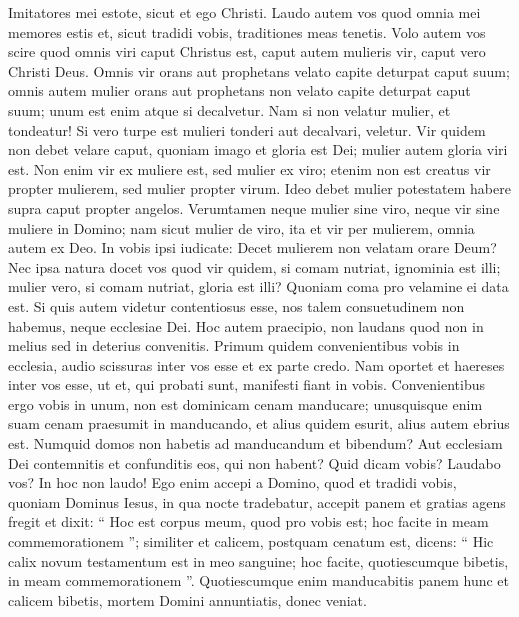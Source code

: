 \begin{biblechapter}
\begin{biblechapter}
\begin{biblechapter}
\begin{biblechapter}
\begin{biblechapter}
\begin{biblechapter}
\begin{biblechapter}
\begin{biblechapter}
\begin{biblechapter}
\begin{biblechapter}
\begin{biblechapter}
\verse Imitatores mei estote, sicut et ego Christi.
 \verse Laudo autem vos quod omnia mei memores estis et, sicut tradidi vobis, traditiones meas tenetis. 
\verse Volo autem vos scire quod omnis viri caput Christus est, caput autem mulieris vir, caput vero Christi Deus. 
\verse Omnis vir orans aut prophetans velato capite deturpat caput suum; 
\verse omnis autem mulier orans aut prophetans non velato capite deturpat caput suum; unum est enim atque si decalvetur. 
\verse Nam si non velatur mulier, et tondeatur! Si vero turpe est mulieri tonderi aut decalvari, veletur.
 \verse Vir quidem non debet velare caput, quoniam imago et gloria est Dei; mulier autem gloria viri est. 
\verse Non enim vir ex muliere est, sed mulier ex viro; 
 \verse etenim non est creatus vir propter mulierem, sed mulier propter virum. 
\verse Ideo debet mulier potestatem habere supra caput propter angelos. 
\verse Verumtamen neque mulier sine viro, neque vir sine muliere in Domino; 
\verse nam sicut mulier de viro, ita et vir per mulierem, omnia autem ex Deo. 
\verse In vobis ipsi iudicate: Decet mulierem non velatam orare Deum? 
\verse Nec ipsa natura docet vos quod vir quidem, si comam nutriat, ignominia est illi; 
\verse mulier vero, si comam nutriat, gloria est illi? Quoniam coma pro velamine ei data est. 
\verse Si quis autem videtur contentiosus esse, nos talem consuetudinem non habemus, neque ecclesiae Dei.
 \verse Hoc autem praecipio, non laudans quod non in melius sed in deterius convenitis. 
\verse Primum quidem convenientibus vobis in ecclesia, audio scissuras inter vos esse et ex parte credo. 
\verse Nam oportet et haereses inter vos esse, ut et, qui probati sunt, manifesti fiant in vobis. 
\verse Convenientibus ergo vobis in unum, non est dominicam cenam manducare; 
\verse unusquisque enim suam cenam praesumit in manducando, et alius quidem esurit, alius autem ebrius est. 
\verse Numquid domos non habetis ad manducandum et bibendum? Aut ecclesiam Dei contemnitis et confunditis eos, qui non habent? Quid dicam vobis? Laudabo vos? In hoc non laudo!
 \verse Ego enim accepi a Domino, quod et tradidi vobis, quoniam Dominus Iesus, in qua nocte tradebatur, accepit panem 
\verse et gratias agens fregit et dixit: “ Hoc est corpus meum, quod pro vobis est; hoc facite in meam commemorationem ”; 
 \verse similiter et calicem, postquam cenatum est, dicens: “ Hic calix novum testamentum est in meo sanguine; hoc facite, quotiescumque bibetis, in meam commemorationem ”. 
\verse Quotiescumque enim manducabitis panem hunc et calicem bibetis, mortem Domini annuntiatis, donec veniat. 

\end{biblechapter}
\end{biblechapter}
\end{biblechapter}
\end{biblechapter}
\end{biblechapter}
\end{biblechapter}
\end{biblechapter}
\end{biblechapter}
\end{biblechapter}
\end{biblechapter}
\end{biblechapter}
